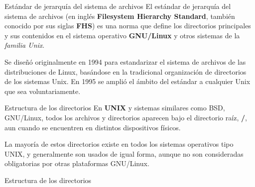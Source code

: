 \begin{frame}[c]{Estándar de jerarquía del sistema de archivos}
  El estándar de jerarquía del sistema de archivos (en inglés \textbf{Filesystem
  Hierarchy Standard}, también conocido por sus siglas \textbf{FHS}) es una
  norma que define los directorios principales y sus contenidos en el sistema
  operativo \textbf{GNU/Linux} y otros sistemas de la \emph{familia Unix}.

  \vspace{\baselineskip}
  Se diseñó originalmente en 1994 para estandarizar el sistema de archivos de
  las distribuciones de Linux, basándose en la tradicional organización de
  directorios de los sistemas Unix. En 1995 se amplió el ámbito del estándar
  a cualquier Unix que sea voluntariamente.
\end{frame}

\begin{frame}[c]{Estructura de los directorios}
  En \textbf{UNIX} y sistemas similares como BSD, GNU/Linux, todos los
  archivos y directorios aparecen bajo el directorio raíz, \textbf{/},
  aun cuando se encuentren en distintos dispositivos físicos.

  \vspace{\baselineskip}
  La mayoría de estos directorios existe en todos los sistemas operativos
  tipo UNIX, y generalmente son usados de igual forma, aunque no son
  consideradas obligatorias por otras plataformas GNU/Linux.
\end{frame}

\begin{frame}[c]{Estructura de los directorios}
\end{frame}

